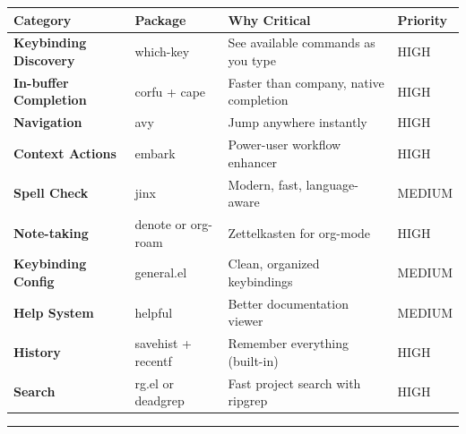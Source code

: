 \documentclass[
  letterpaper,
  DIV=11,
  numbers=noendperiod]{scrreprt}
\begin{document}
\begin{longtable}[]{@{}
  >{\raggedright\arraybackslash}p{}
  >{\raggedright\arraybackslash}p{}
  >{\raggedright\arraybackslash}p{}
  >{\raggedright\arraybackslash}p{}@{}}
\toprule\noalign{}
\begin{minipage}[b]{\linewidth}\raggedright
\textbf{Category}
\end{minipage} & \begin{minipage}[b]{\linewidth}\raggedright
\textbf{Package}
\end{minipage} & \begin{minipage}[b]{\linewidth}\raggedright
\textbf{Why Critical}
\end{minipage} & \begin{minipage}[b]{\linewidth}\raggedright
\textbf{Priority}
\end{minipage} \\
\midrule\noalign{}
\endhead
\bottomrule\noalign{}
\endlastfoot
\textbf{Keybinding Discovery} & which-key & See available commands as
you type & HIGH \\
\textbf{In-buffer Completion} & corfu + cape & Faster than company,
native completion & HIGH \\
\textbf{Navigation} & avy & Jump anywhere instantly & HIGH \\
\textbf{Context Actions} & embark & Power-user workflow enhancer &
HIGH \\
\textbf{Spell Check} & jinx & Modern, fast, language-aware & MEDIUM \\
\textbf{Note-taking} & denote or org-roam & Zettelkasten for org-mode &
HIGH \\
\textbf{Keybinding Config} & general.el & Clean, organized keybindings &
MEDIUM \\
\textbf{Help System} & helpful & Better documentation viewer & MEDIUM \\
\textbf{History} & savehist + recentf & Remember everything (built-in) &
HIGH \\
\textbf{Search} & rg.el or deadgrep & Fast project search with ripgrep &
HIGH \\
\end{longtable}

\begin{center}\rule{0.5\linewidth}{0.5pt}\end{center}
\end{document}
